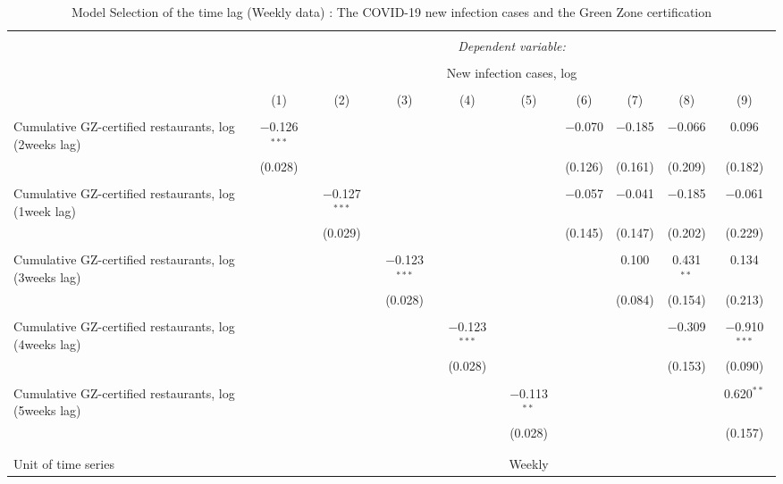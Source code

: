 
\begin{table}[!htbp] \centering 
  \caption{Model Selection of the time lag (Weekly data) : The COVID-19 new infection cases and the Green Zone certification} 
  \label{} 
\scriptsize 
\begin{tabular}{@{\extracolsep{1pt}}lccccccccc} 
\\[-1.8ex]\hline 
\hline \\[-1.8ex] 
 & \multicolumn{9}{c}{\textit{Dependent variable:}} \\ 
\cline{2-10} 
\\[-1.8ex] & \multicolumn{9}{c}{New infection cases, log} \\ 
\\[-1.8ex] & (1) & (2) & (3) & (4) & (5) & (6) & (7) & (8) & (9)\\ 
\hline \\[-1.8ex] 
 Cumulative GZ-certified restaurants, log (2weeks lag) & $-$0.126$^{***}$ &  &  &  &  & $-$0.070 & $-$0.185 & $-$0.066 & 0.096 \\ 
  & (0.028) &  &  &  &  & (0.126) & (0.161) & (0.209) & (0.182) \\ 
  & & & & & & & & & \\ 
 Cumulative GZ-certified restaurants, log (1week lag) &  & $-$0.127$^{***}$ &  &  &  & $-$0.057 & $-$0.041 & $-$0.185 & $-$0.061 \\ 
  &  & (0.029) &  &  &  & (0.145) & (0.147) & (0.202) & (0.229) \\ 
  & & & & & & & & & \\ 
 Cumulative GZ-certified restaurants, log (3weeks lag) &  &  & $-$0.123$^{***}$ &  &  &  & 0.100 & 0.431$^{**}$ & 0.134 \\ 
  &  &  & (0.028) &  &  &  & (0.084) & (0.154) & (0.213) \\ 
  & & & & & & & & & \\ 
 Cumulative GZ-certified restaurants, log (4weeks lag) &  &  &  & $-$0.123$^{***}$ &  &  &  & $-$0.309 & $-$0.910$^{***}$ \\ 
  &  &  &  & (0.028) &  &  &  & (0.153) & (0.090) \\ 
  & & & & & & & & & \\ 
 Cumulative GZ-certified restaurants, log (5weeks lag) &  &  &  &  & $-$0.113$^{**}$ &  &  &  & 0.620$^{**}$ \\ 
  &  &  &  &  & (0.028) &  &  &  & (0.157) \\ 
  & & & & & & & & & \\ 
\hline \\[-1.8ex] 
Unit of time series &  &  &  &  & Weekly &  &  &  &  \\ 

\end{tabular}
\end{table}
